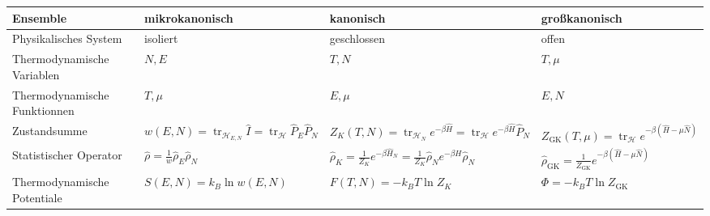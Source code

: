 \documentclass[11pt]{article}
\theoremstyle{plain}
\newcommand{\trace}{\operatorname{tr}}
\begin{document}
\begin{table}[htpb]
  \centering
  \begin{tabular}{p{4.5cm}|p{3cm}|p{3cm}|p{3cm}}
    Ensemble & mikrokanonisch & kanonisch & gro\ss{}kanonisch \\
    \hline 
    Physikalisches System & isoliert & geschlossen & offen \\
    \hline 
    Thermodynamische Variablen & $N, E$ & $T,N$ & $T, \mu$ \\
    \hline 
    Thermodynamische Funktionnen & $T, \mu$ & $E, \mu$ & $E, N$ \\ 
    \hline 
    Zustandsumme & $w(E, N) = \trace_{\mathcal{H}_{E,N}} \hat{I} = 
    \trace_{\mathcal{H}} \hat{P}_E \hat{P}_N$ & $Z_K (T, N) = 
    \trace_{\mathcal{H}_N} e ^{-\beta \hat{H}} = 
    \trace_{\mathcal{H}} e^{-\beta \hat{H}} \hat{P}_N$ & 
    $Z_{\text{GK}}(T, \mu) = \trace_{\mathcal{H}} e^{-\beta(\hat{H} -\mu \hat{N})}$ \\
    \hline 
    Statistischer Operator & 
    $ \hat{\rho} = \frac{1}{w} \hat{\rho}_E \hat{\rho}_N$ & 
    $\hat{\rho}_K = \frac{1}{Z_K} e^{-\beta \hat{H}_N}
    = \frac{1}{Z_K} \hat{\rho}_N e ^{-\beta H} \hat{\rho}_N$ & 
    $\hat{\rho}_{\text{GK}} = \frac{1}{Z_{\text{GK}}} e^{-\beta (\hat{H} - \mu \hat{N})}$ \\
    \hline 
    Thermodynamische Potentiale & $S(E, N) = k_B \ln{ w (E, N)}$ & 
    $F(T, N) = -k_B T \ln{Z_K}$ & $\Phi = -k_B T \ln{Z_{\text{GK}}}$ \\
    \hline 
  \end{tabular}
\end{table}
%
\end{document}

